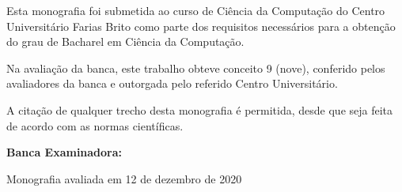 \begin{folhadeaprovacao}



\vspace{1cm}

Esta monografia foi submetida ao curso de Ciência da Computação do Centro Universitário Farias Brito como parte dos requisitos necessários para a obtenção do grau de Bacharel em Ciência da Computação.

\vspace{1cm}

Na avaliação da banca, este trabalho obteve conceito 9 (nove), conferido pelos avaliadores da banca e outorgada pelo referido Centro Universitário.

\vspace{1cm}

A citação de qualquer trecho desta monografia é permitida, desde que seja feita de acordo com as normas científicas.

\vspace{2cm}

\assinatura{\imprimirautor}

\vspace{2cm}

\textbf{Banca Examinadora:}



\vfill

\begin{center}
    Monografia avaliada em 12 de dezembro de 2020
\end{center}

\end{folhadeaprovacao}
